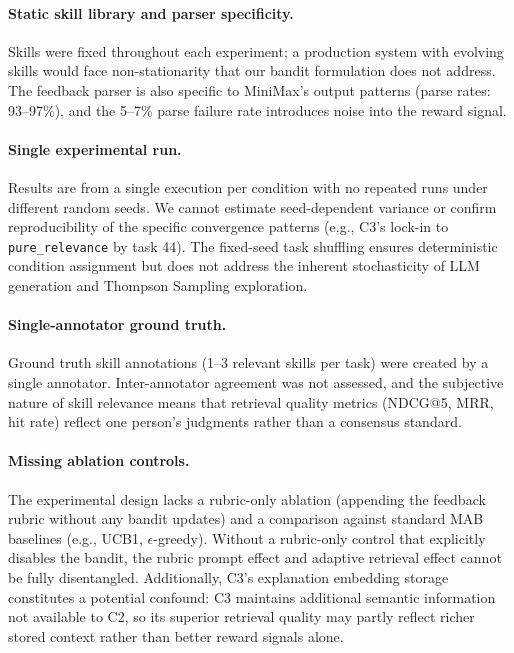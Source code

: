 \paragraph{Static skill library and parser specificity.}
Skills were fixed throughout each experiment; a production system with evolving skills would face non-stationarity that our bandit formulation does not address.
The feedback parser is also specific to MiniMax's output patterns (parse rates: 93--97\%), and the 5--7\% parse failure rate introduces noise into the reward signal.

\paragraph{Single experimental run.}
Results are from a single execution per condition with no repeated runs under different random seeds.
We cannot estimate seed-dependent variance or confirm reproducibility of the specific convergence patterns (e.g., C3's lock-in to \texttt{pure\_relevance} by task 44).
The fixed-seed task shuffling ensures deterministic condition assignment but does not address the inherent stochasticity of LLM generation and Thompson Sampling exploration.

\paragraph{Single-annotator ground truth.}
Ground truth skill annotations (1--3 relevant skills per task) were created by a single annotator.
Inter-annotator agreement was not assessed, and the subjective nature of skill relevance means that retrieval quality metrics (NDCG@5, MRR, hit rate) reflect one person's judgments rather than a consensus standard.

\paragraph{Missing ablation controls.}
The experimental design lacks a rubric-only ablation (appending the feedback rubric without any bandit updates) and a comparison against standard MAB baselines (e.g., UCB1, $\epsilon$-greedy).
Without a rubric-only control that explicitly disables the bandit, the rubric prompt effect and adaptive retrieval effect cannot be fully disentangled.
Additionally, C3's explanation embedding storage constitutes a potential confound: C3 maintains additional semantic information not available to C2, so its superior retrieval quality may partly reflect richer stored context rather than better reward signals alone.

